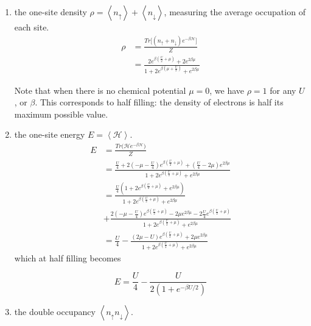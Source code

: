 \documentclass[10pt, twocolumn, twoside]{article}
\begin{document}
\begin{enumerate}
\item the one-site density $\rho = \left\langle n_\uparrow \right\rangle + \left\langle n_\downarrow \right\rangle$, measuring the average occupation of each site.
\begin{equation}
\begin{split}
\rho &= \frac{Tr \big[ (n_\uparrow + n_\downarrow ) e^{-\beta\mathcal{H}} \big]}{Z} \\
&= \frac{2 e^{\beta(\frac{U}{2} + \mu)} + 2 e^{2\beta\mu}}{1 + 2 e^{\beta(\mu + \frac{U}{2})} + e^{2 \beta \mu}}
\end{split}
\end{equation}

Note that when there is no chemical potential $\mu = 0$, we have $\rho = 1$ for any $U$, or $\beta$. This corresponds to half filling: the density of electrons is half its maximum possible value.

\item the one-site energy $E = \left\langle \mathcal{H} \right\rangle$.
\begin{equation}
\begin{split}
E &= \frac{Tr\bigg( \mathcal{H}e^{-\beta\mathcal{H} } \bigg)}{Z} \\
&= \frac{ \frac{U}{4} + 2 ( -\mu - \frac{U}{4} ) e^{\beta(\frac{U}{2} + \mu )} + (\frac{U}{4} - 2\mu ) e^{2\beta\mu}}{1 + 2 e^{\beta (\frac{U}{2} + \mu )} + e^{2\beta\mu} } \\
&= \frac{ \frac{U}{4} ( 1 + 2 e^{\beta (\frac{U}{2} + \mu )} + e^{2\beta\mu} )}{1 + 2 e^{\beta (\frac{U}{2} + \mu )} + e^{2\beta\mu} } \\
&+ \frac{2(-\mu - \frac{U}{4}) e^{\beta(\frac{U}{2} + \mu)} - 2\mu e^{2\beta\mu} - 2\frac{U}{4} e^{\beta (\frac{U}{2} + \mu)} }{1 + 2 e^{\beta (\frac{U}{2} + \mu )} + e^{2\beta\mu}} \\
&= \frac{U}{4} - \frac{ (2\mu - U) e^{\beta(\frac{U}{2} + \mu) } + 2\mu e^{2\beta\mu} }{1 + 2 e^{\beta (\frac{U}{2} + \mu )} + e^{2\beta\mu} }
\end{split}
\end{equation}
which at half filling becomes

\begin{equation}
E = \frac{U}{4} - \frac{U}{2 ( 1 + e^{-\beta U /2} )}
\end{equation}

\item the double occupancy $\left\langle n_\uparrow n_\downarrow \right\rangle$.


\end{enumerate}
\end{document}
